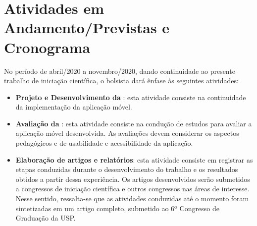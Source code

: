 \chapter{Atividades em Andamento/Previstas e Cronograma} \label{sec:atividades_futuras}

No período de abril/2020 a novembro/2020, dando continuidade ao presente trabalho de iniciação científica, o bolsista dará ênfase às seguintes atividades:

\begin{itemize}
    
    \item \textbf{Projeto e Desenvolvimento da \crossword}: esta atividade consiste na continuidade da implementação da aplicação móvel.
    \item \textbf{Avaliação da \crossword}: esta atividade consiste na condução de estudos  para avaliar a aplicação móvel desenvolvida. As avaliações devem considerar os aspectos pedagógicos e de usabilidade e acessibilidade da aplicação.
    \item \textbf{Elaboração de artigos e relatórios}: esta atividade consiste em registrar as etapas conduzidas durante o desenvolvimento do trabalho e os resultados obtidos a partir dessa experiência. Os artigos desenvolvidos serão submetidos a congressos de iniciação científica e outros congressos nas áreas de interesse.
    Nesse sentido, ressalta-se que as atividades conduzidas até o momento foram sintetizadas em um artigo completo, submetido ao 6º Congresso de Graduação da USP. 
\end{itemize}

